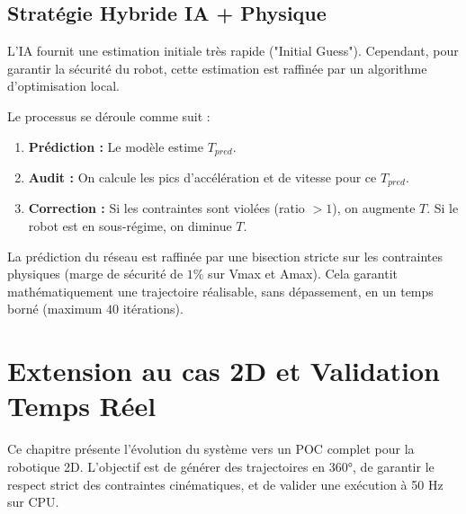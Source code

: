 \documentclass[12pt]{report}
\theoremstyle{plain}
\begin{document}
\section{Stratégie Hybride IA + Physique}
L'IA fournit une estimation initiale très rapide ("Initial Guess"). Cependant, pour garantir la sécurité du robot, cette estimation est raffinée par un algorithme d'optimisation local.

Le processus se déroule comme suit :
\begin{enumerate}
    \item \textbf{Prédiction :} Le modèle estime $T_{pred}$.
    \item \textbf{Audit :} On calcule les pics d'accélération et de vitesse pour ce $T_{pred}$.
    \item \textbf{Correction :} Si les contraintes sont violées (ratio $> 1$), on augmente $T$. Si le robot est en sous-régime, on diminue $T$.
\end{enumerate}

La prédiction du réseau est raffinée par une bisection stricte sur les contraintes physiques (marge de sécurité de $1\%$ sur Vmax et Amax). Cela garantit mathématiquement une trajectoire réalisable, sans dépassement, en un temps borné (maximum $40$ itérations).









\chapter{Extension au cas 2D et Validation Temps Réel}
\label{sec:poc_2d}

Ce chapitre présente l'évolution du système vers un POC complet pour la robotique 2D. L'objectif est de générer des trajectoires en 360°, de garantir le respect strict des contraintes cinématiques, et de valider une exécution à 50 Hz sur CPU.
\end{document}
